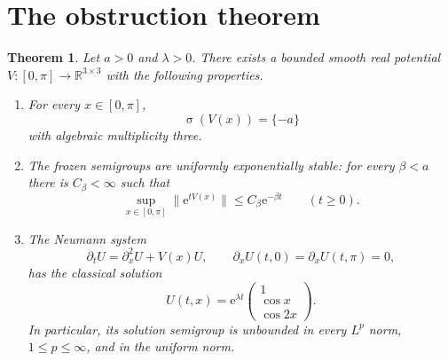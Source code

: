 \documentclass[11pt,a4paper]{article}
\newtheorem{theorem}{Theorem}
\newcommand{\R}{\mathbb{R}}
\newcommand{\e}{\mathrm{e}}
\DeclareMathOperator{\spec}{\sigma}
\begin{document}
\section{The obstruction theorem}

\begin{theorem}\label{thm:main}
Let $a>0$ and $\lambda>0$.  There exists a bounded smooth real potential
$V\colon[0,\pi]\to\R^{3\times3}$ with the following properties.
\begin{enumerate}
  \item For every $x\in[0,\pi]$,
  \[
     \spec(V(x))=\{-a\}
  \]
  with algebraic multiplicity three.
  \item The frozen semigroups are uniformly exponentially stable: for every
  $\beta<a$ there is $C_\beta<\infty$ such that
  \[
     \sup_{x\in[0,\pi]}\|\e^{tV(x)}\|
       \le C_\beta\e^{-\beta t}\qquad(t\ge0).
  \]
  \item The Neumann system
  \[
     \partial_tU=\partial_x^2U+V(x)U,\qquad
     \partial_xU(t,0)=\partial_xU(t,\pi)=0,
  \]
  has the classical solution
  \[
     U(t,x)=\e^{\lambda t}
       \begin{pmatrix}1\\ \cos x\\ \cos 2x\end{pmatrix}.
  \]
  In particular, its solution semigroup is unbounded in every $L^p$ norm,
  $1\le p\le\infty$, and in the uniform norm.
\end{enumerate}
\end{theorem}
\end{document}
